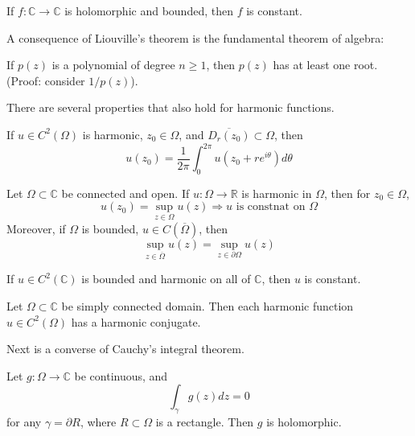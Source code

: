 \documentclass[openany]{book}
\newcommand{\R}{\mathbb{R}}
\newcommand{\C}{\mathbb{C}}
\begin{document}
\begin{thm}
    If $f:\C\to\C$ is holomorphic and bounded, then $f$ is constant.
\end{thm}
A consequence of Liouville's theorem is the fundamental theorem of algebra:
\begin{prop}
    If $p(z)$ is a polynomial of degree $n\geq 1$, then $p(z)$ has at least one root. (Proof: consider $1/p(z)$).
\end{prop}
There are several properties that also hold for harmonic functions.
\begin{prop}
    If $u\in C^2(\Omega)$ is harmonic, $z_0\in\Omega$, and $\overline{D_r(z_0)}\subset\Omega$, then 
    \begin{equation*}
        u(z_0)=\frac{1}{2\pi}\int_0^{2\pi}u(z_0+re^{i\theta})d\theta
    \end{equation*}
\end{prop}


\begin{prop}
    Let $\Omega\subset\C$ be connected and open. If $u:\Omega\to\R$ is harmonic in $\Omega$, then for $z_0\in\Omega$,
    \begin{equation*}
        u(z_0)=\sup_{z\in\Omega}u(z)\Rightarrow u \text{ is constnat on $\Omega$}
    \end{equation*}
    Moreover, if $\Omega$ is bounded, $u\in C(\overline{\Omega})$, then 
    \begin{equation*}
        \sup_{z\in\overline{\Omega}}u(z)=\sup_{z\in\partial\Omega}u(z)
    \end{equation*}
\end{prop}

\begin{prop}
    If $u\in C^2(\C)$ is bounded and harmonic on all of $\C$, then $u$ is constant.
\end{prop}

\begin{prop}
    Let $\Omega\subset\C$ be simply connected domain. Then each harmonic function $u\in C^2(\Omega)$ has a harmonic conjugate.
\end{prop}
Next is a converse of Cauchy's integral theorem.
\begin{thm}
    Let $g:\Omega\to\C$ be continuous, and 
    \begin{equation*}
        \int_\gamma g(z)dz=0
    \end{equation*}
    for any $\gamma=\partial R$, where $R\subset\Omega$ is a rectangle. Then $g$ is holomorphic.
\end{thm}
\end{document}
